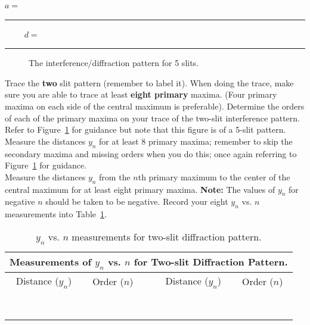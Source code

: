 \begin{center}
$a=$~ \rule{3cm}{.1mm}~~~~ $d=$~ \rule{3cm}{.1mm}
\end{center}
\vspace*{.5cm}

\begin{figure}[htb]
\centerline{\epsfxsize=15cm }
\caption{The interference/diffraction pattern for 5 slits.}
\label{fig:diff:interpatt}
\end{figure}

\noindent Trace the {\bf two} slit pattern (remember to label it). 
When doing the trace,
make sure you are able to trace at least {\bf eight primary} maxima. (Four
primary maxima on each side of the central maximum is preferable).
Determine the orders of each of the primary maxima on your trace of
the two-slit interference pattern. Refer to Figure~\ref{fig:diff:interpatt}
for guidance but note that this figure is of a 5-slit pattern.
Measure the distances $y_n$ for at least 8 primary maxima; remember to skip
the secondary maxima and missing orders when you do this; once again 
referring  to Figure~\ref{fig:diff:interpatt} for guidance. \\

\noindent
Measure the distances $y_n$ from the $n$th primary maximum to the
center of the central maximum for at least eight primary maxima. {\bf
Note:} The values of $y_n$ for negative $n$ should be taken to be
negative. Record your eight $y_n$ vs. $n$ measurements into 
Table~\ref{tab:DI:twoslit}.

\begin{table}[htb]
\begin{center}
\begin{tabular}{|c|c|c|c|c|}
\hline
\multicolumn{5}{|c|}{Measurements of $y_n$ vs. $n$ for Two-slit Diffraction Pattern.} \\
\hline
Distance ($y_n$) & Order ($n$) & & Distance ($y_n$) & Order ($n$) \\
\hline
\hspace*{3cm} & \hspace*{3cm} & \hspace*{.3cm} & \hspace*{3cm} & \hspace*{3cm} \\
& & & & \\
\hline
& & & & \\ & & & & \\
\hline
& & & & \\ & & & & \\
\hline
& & & & \\ & & & & \\
\hline
\end{tabular}
\end{center}
\caption{$y_n$ vs. $n$ measurements for two-slit diffraction pattern.}
\label {tab:DI:twoslit}
\end{table}

